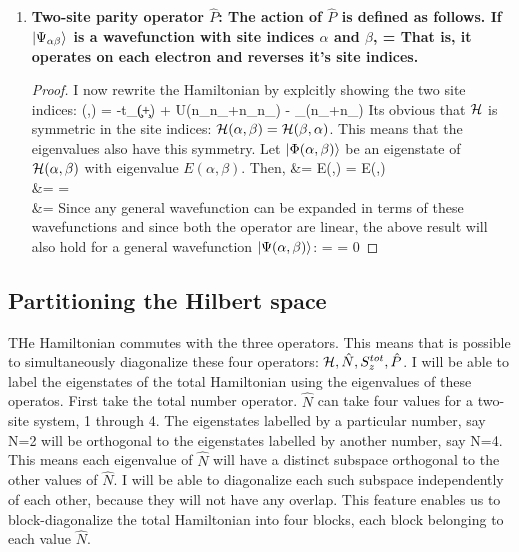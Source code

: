 \documentclass[12pt]{article}
\begin{document}
\begin{enumerate}
\item \bf{Two-site parity operator \(\hat{P}\)}: The action of \(\hat{P}\) is defined as follows. If \(\ket{\Psi_{\alpha\beta}}\) is a wavefunction with site indices \(\alpha\) and \(\beta\), 
\beq
{}\ket{\Psi(\alpha,\beta)} = \ket{\Psi(\beta,\alpha)}
\eeq
That is, it operates on each electron and reverses it's site indices. 
\begin{proof}
I now rewrite the Hamiltonian by explcitly showing the two site indices:
\beq
\ham(\alpha,\beta) = -t\sum_\sigma(\C{\alpha}{\sigma}\c{\beta}{\sigma}+\C{\beta}{\sigma}\c{\alpha}{\sigma}) + U(n_{\alpha\uparrow}n_{\alpha\downarrow}+n_{\beta\uparrow}n_{\beta\downarrow}) - \mu\sum_\sigma(n_{\alpha\sigma}+n_{\beta\sigma})
\eeq 
Its obvious that \(\mathcal{H}\) is symmetric in the site indices: \(\mathcal{H}(\alpha,\beta) = \mathcal{H}(\beta,\alpha)\). This means that the eigenvalues also have this symmetry. Let \(\ket{\Phi(\alpha,\beta)}\) be an eigenstate of \(\mathcal{H}(\alpha,\beta)\) with eigenvalue \(E(\alpha,\beta)\). Then,
\beq
{}\ham\ket{\Phi(\alpha,\beta)} &= E(\alpha,\beta) \ket{\Phi(\alpha,\beta)} = E(\beta,\alpha) \ket{\Phi(\beta,\alpha)} \\
&= \ham \ket{\Phi(\beta,\alpha)} = \ham {} \ket{\Phi(\alpha,\beta)} \\
\implies \ham{}\ket{\Phi(\alpha,\beta)} &= \ham\ket{\Phi(\alpha,\beta)}
\eeq
Since any general wavefunction can be expanded in terms of these wavefunctions and since both the operator are linear, the above result will also hold for a general wavefunction \(\ket{\Psi(\alpha,\beta)}\):
\beq
\ham {} \ket{\Psi(\alpha,\beta)} =  \ham \ket{\Psi(\alpha,\beta)}
 = 0
\eeq
\end{proof}
\end{enumerate}
\subsection{Partitioning the Hilbert space}
THe Hamiltonian commutes with the three operators. This means that is possible to simultaneously diagonalize these four operators: \(\mathcal{H}, \hat{N}, S_z^{tot}, \hat{P}\). I will be able to label the eigenstates of the total Hamiltonian using the eigenvalues of these operatos. First take the total number operator. \(\hat{N}\) can take four values for a two-site system, 1 through 4. The eigenstates labelled by a particular number, say N=2 will be orthogonal to the eigenstates labelled by another number, say N=4. This means each eigenvalue of \(\hat{N}\) will have a distinct subspace orthogonal to the other values of \(\hat{N}\). I will be able to diagonalize each such subspace independently of each other, because they will not have any overlap. This feature enables us to block-diagonalize the total Hamiltonian into four blocks, each block belonging to each value \(\hat{N}\). 
\end{document}
